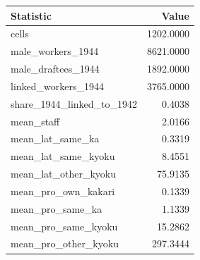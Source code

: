 \begin{tabular}{lr}
\hline
Statistic & Value \\
\hline
cells & 1202.0000 \\
male_workers_1944 & 8621.0000 \\
male_draftees_1944 & 1892.0000 \\
linked_workers_1944 & 3765.0000 \\
share_1944_linked_to_1942 & 0.4038 \\
mean_staff & 2.0166 \\
mean_lat_same_ka & 0.3319 \\
mean_lat_same_kyoku & 8.4551 \\
mean_lat_other_kyoku & 75.9135 \\
mean_pro_own_kakari & 0.1339 \\
mean_pro_same_ka & 1.1339 \\
mean_pro_same_kyoku & 15.2862 \\
mean_pro_other_kyoku & 297.3444 \\
\hline
\end{tabular}
